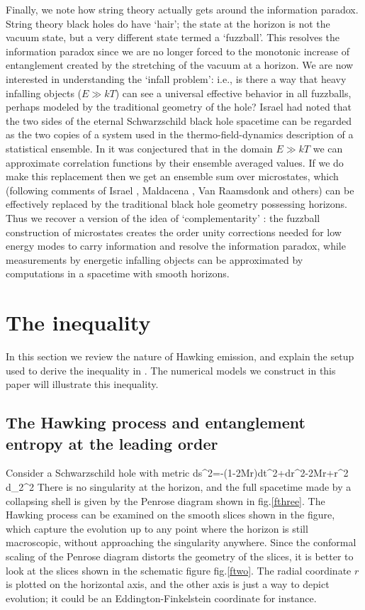 \documentclass[12pt]{article}
\begin{document}
Finally, we note how string theory actually gets around the information paradox. String theory black holes do have `hair';   the state at the horizon is not the vacuum state, but a very different state termed a `fuzzball'. This resolves the information paradox since we are no longer forced to the monotonic increase of entanglement created by the stretching of the vacuum at a horizon. We are now interested in understanding the `infall problem': i.e., is there a way that heavy infalling objects ($E\gg kT$) can see a universal effective behavior in all fuzzballs, perhaps modeled by the traditional geometry of the hole? Israel \cite{israel2} had noted that the two sides of the eternal Schwarzschild black hole  spacetime can be regarded as the two copies of a system used in the thermo-field-dynamics description \cite{umezawa} of a statistical ensemble. In \cite{mathurrecent} it was conjectured that in the domain $E\gg kT$ we can approximate  correlation functions by their ensemble averaged values. If we do make this replacement then we get an ensemble sum over microstates, which (following comments of Israel \cite{israel2}, Maldacena \cite{maldacena2}, Van Raamsdonk \cite{raamsdonk} and others) can be effectively replaced by the traditional black hole geometry possessing horizons. Thus we recover a version of the idea of `complementarity' \cite{thooft1,suss1}: the fuzzball construction of microstates creates the order unity corrections needed for low energy modes to carry information and resolve the information paradox, while measurements by energetic infalling objects can be approximated by computations in a spacetime with smooth horizons. 
 
\section{The inequality}
\label{ineq}\setcounter{equation}{0}

In this section we review the nature of Hawking emission, and explain the setup used to derive the inequality in \cite{mathurfuzz}. The numerical models we construct in this paper will illustrate this inequality.

\subsection{The Hawking process and entanglement entropy at the leading order}

Consider a Schwarzschild hole with metric
\be
ds^2=-(1-{2M\over r})dt^2+{dr^2-{2M\over r}}+r^2 d\Omega_2^2
\label{qthree}
\ee
There is no singularity at the horizon, and the full spacetime made by a collapsing shell is given by the Penrose diagram shown in fig.\ref{fthree}. 
The Hawking process can be examined on the smooth slices shown in the figure, which capture the evolution up to any point where the horizon is still macroscopic,  without approaching the singularity anywhere. Since the conformal scaling of the Penrose diagram distorts the geometry of the slices, it is better to look at the slices shown in the schematic figure fig.\ref{ftwo}. The radial coordinate $r$ is plotted on the horizontal axis, and the other axis is just a way to depict evolution; it could be an Eddington-Finkelstein coordinate for instance.
\end{document}
